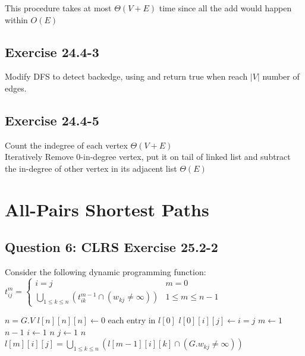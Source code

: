 \documentclass[]{article}
\begin{document}
This procedure takes at most $\Theta(V+E)$ time since all the add would happen within $O(E)$

\subsection{Exercise 24.4-3}

Modify DFS to detect backedge, using  and return true when reach $|V|$ number of edges.

\subsection{Exercise 24.4-5}
Count the indegree of each vertex $\Theta(V+E)$\\
Iteratively Remove 0-in-degree vertex, put it on tail of linked list and subtract the in-degree of other vertex in its adjacent list $\Theta(E)$

\section{All-Pairs Shortest Paths}

\subsection{Question 6: CLRS Exercise 25.2-2}
Consider the following dynamic programming function:\\
$
t_{ij}^{m} = 
\begin{cases}
i = j & m = 0\\
\underset{1 \le k \le n}\bigcup (t_{ik}^{m-1} \cap (w_{kj} \neq \infty)) & 1 \le m \le n-1
\end{cases}
$

\begin{codebox}
	\li $n = G.V$
	\li $l[n][n][n] \leftarrow 0$
	\li \For each entry in $l[0]$
	\li \Do $l[0][i][j] \leftarrow i = j$ \End
	\li \For $m \leftarrow 1$ \To $n-1$
	\li \Do \For $i \leftarrow 1$ \To $n$
	\li \Do \For $j \leftarrow 1$ \To $n$
	\li \Do $l[m][i][j] = \underset{1 \le k \le n}\bigcup (l[m-1][i][k] \cap (G.w_{kj} \neq \infty))$
	\End \End \End
\end{codebox}
\end{document}
